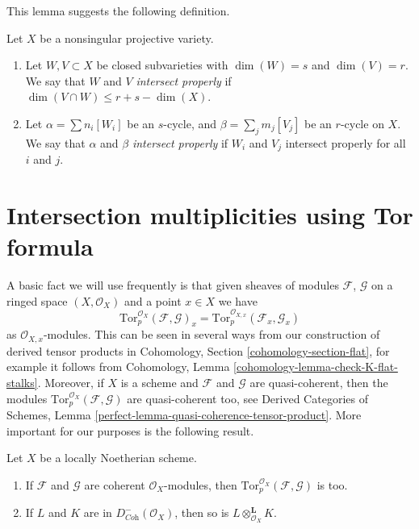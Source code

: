 \noindent
This lemma suggests the following definition.

\begin{definition}
\label{definition-proper-intersection}
Let $X$ be a nonsingular projective variety.
\begin{enumerate}
\item Let $W,V \subset X$ be closed subvarieties with
$\dim(W) = s$ and $\dim(V) = r$. We say that $W$ and $V$
{\it intersect properly} if $\dim(V \cap W) \leq r + s - \dim(X)$.
\item Let $\alpha = \sum n_i [W_i]$ be an $s$-cycle,
and $\beta = \sum_j m_j [V_j]$ be an $r$-cycle on $X$. We say
that $\alpha$ and $\beta$ {\it intersect properly} if
$W_i$ and $V_j$ intersect properly for all $i$ and $j$.
\end{enumerate}
\end{definition}


\section{Intersection multiplicities using Tor formula}
\label{section-tor-formula}

\noindent
A basic fact we will use frequently is that given sheaves of
modules $\mathcal{F}$, $\mathcal{G}$ on a ringed space $(X, \mathcal{O}_X)$
and a point $x \in X$ we have
$$
\text{Tor}_p^{\mathcal{O}_X}(\mathcal{F}, \mathcal{G})_x =
\text{Tor}_p^{\mathcal{O}_{X, x}}(\mathcal{F}_x, \mathcal{G}_x)
$$
as $\mathcal{O}_{X, x}$-modules. This can be seen in several ways
from our construction of derived tensor products in
Cohomology, Section \ref{cohomology-section-flat}, for example it follows from
Cohomology, Lemma \ref{cohomology-lemma-check-K-flat-stalks}.
Moreover, if $X$ is a scheme and $\mathcal{F}$ and $\mathcal{G}$
are quasi-coherent, then the modules
$\text{Tor}_p^{\mathcal{O}_X}(\mathcal{F}, \mathcal{G})$ are
quasi-coherent too, see
Derived Categories of Schemes, Lemma
\ref{perfect-lemma-quasi-coherence-tensor-product}.
More important for our purposes is the following result.

\begin{lemma}
\label{lemma-tensor-coherent}
Let $X$ be a locally Noetherian scheme.
\begin{enumerate}
\item If $\mathcal{F}$ and $\mathcal{G}$ are coherent $\mathcal{O}_X$-modules,
then $\text{Tor}_p^{\mathcal{O}_X}(\mathcal{F}, \mathcal{G})$ is too.
\item If $L$ and $K$ are in $D^-_{\textit{Coh}}(\mathcal{O}_X)$, then
so is $L \otimes_{\mathcal{O}_X}^\mathbf{L} K$.
\end{enumerate}
\end{lemma}

